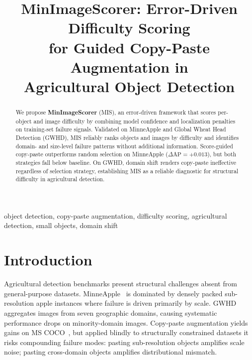 \documentclass[conference]{IEEEtran}
\begin{document}
\title{MinImageScorer: Error-Driven Difficulty Scoring\\
for Guided Copy-Paste Augmentation in\\
Agricultural Object Detection}

\author{
}

\maketitle

\begin{abstract}
We propose \textbf{MinImageScorer} (MIS), an error-driven framework
that scores per-object and image difficulty by combining model
confidence and localization penalties on training-set failure signals.
Validated on MinneApple and Global Wheat Head Detection (GWHD), MIS
reliably ranks objects and images by difficulty and identifies
domain- and size-level failure patterns without additional information.
Score-guided copy-paste outperforms random selection on MinneApple
($\Delta\mathrm{AP}{=}{+}0.013$), but both strategies fall below
baseline. On GWHD, domain shift renders copy-paste ineffective
regardless of selection strategy, establishing MIS as a reliable
diagnostic for structural difficulty in agricultural detection.
\end{abstract}

\begin{IEEEkeywords}
object detection, copy-paste augmentation, difficulty scoring,
agricultural detection, small objects, domain shift
\end{IEEEkeywords}

\section{Introduction}

Agricultural detection benchmarks present structural challenges absent
from general-purpose datasets. MinneApple~\cite{hani2020minneapple}
is dominated by densely packed sub-resolution apple instances where
failure is driven primarily by scale. GWHD~\cite{david2021global}
aggregates images from seven geographic domains, causing systematic
performance drops on minority-domain images. Copy-paste augmentation
yields gains on MS COCO~\cite{kisantal2019augmentation,ghiasi2021simple},
but applied blindly to structurally constrained datasets it risks
compounding failure modes: pasting sub-resolution objects amplifies
scale noise; pasting cross-domain objects amplifies distributional
mismatch.
\end{document}
